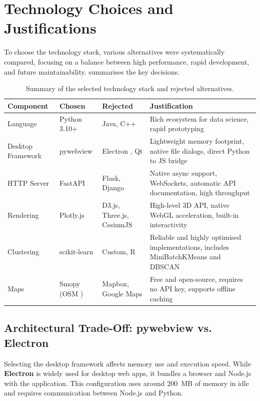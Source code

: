 \section{Technology Choices and Justifications}
\label{sec:tech-choices}

To choose the technology stack, various alternatives were systematically compared, focusing on a balance between high performance, rapid development, and future maintainability.  summarises the key decisions.

\begin{table}[htbp]
\centering
\caption{Summary of the selected technology stack and rejected alternatives.}
\label{tab:tech-decisions}
\footnotesize
\renewcommand{\arraystretch}{1.15}
\begin{tabularx}{\textwidth}{@{}l l l >{\raggedright\arraybackslash}X@{}}
\toprule
\textbf{Component} & \textbf{Chosen} & \textbf{Rejected} & \textbf{Justification} \\
\midrule
Language & Python 3.10+ & Java, C++ & Rich ecosystem for data science, rapid prototyping \\
Desktop Framework & pywebview \cite{pywebview} & Electron \cite{electron}, Qt & Lightweight memory footprint, native file dialogs, direct Python to JS bridge \\
HTTP Server & FastAPI \cite{fastapi} & Flask, Django & Native async support, WebSockets, automatic API documentation, high throughput \\
Rendering & Plotly.js \cite{plotlyjs} & D3.js, Three.js, CesiumJS & High-level 3D API, native WebGL acceleration, built-in interactivity \\
Clustering & scikit-learn \cite{pedregosa2011sklearn} & Custom, R & Reliable and highly optimised implementations, includes MiniBatchKMeans and DBSCAN\\
Maps & Smopy \cite{smopy} (OSM \cite{openstreetmap}) & Mapbox, Google Maps & Free and open-source, requires no API key, supports offline caching \\
\bottomrule
\end{tabularx}
\end{table}

\subsection{Architectural Trade-Off: pywebview vs. Electron}

Selecting the desktop framework affects memory use and execution speed. While \textbf{Electron} \cite{electron} is widely used for desktop web apps, it bundles a browser and Node.js with the application. This configuration uses around 200~MB of memory in idle and requires communication between Node.js and Python.


